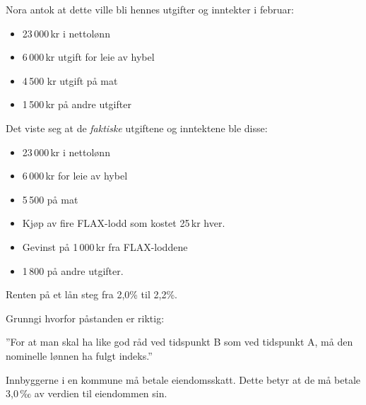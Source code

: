 Nora antok at dette ville bli hennes utgifter og inntekter i februar:
\begin{itemize}
	\item 23\,000\,kr i nettolønn 
	\item 6\,000\,kr utgift for leie av hybel
	\item 4\,500 kr utgift på mat
	\item 1\,500\,kr på andre utgifter
\end{itemize}
Det viste seg at de \textsl{faktiske} utgiftene og inntektene ble disse:
\begin{itemize}
	\item 23\,000\,kr i nettolønn
	\item 6\,000\,kr for leie av hybel
	\item 5\,500 på mat
	\item Kjøp av fire FLAX-lodd som kostet 25\,kr hver.
	\item Gevinst på 1\,000\,kr fra FLAX-loddene
	\item 1\,800 på andre utgifter.
\end{itemize}

Renten på et lån steg fra 2,0\% til 2,2\%.

Grunngi hvorfor påstanden er riktig:
\begin{center}
	''For at man skal ha like god råd ved tidspunkt B som ved tidspunkt A, må den nominelle lønnen ha fulgt indeks.''
\end{center}

Innbyggerne i en kommune må betale eiendomsskatt. Dette betyr at de må betale 3,0\,‰ av verdien til eiendommen sin.

